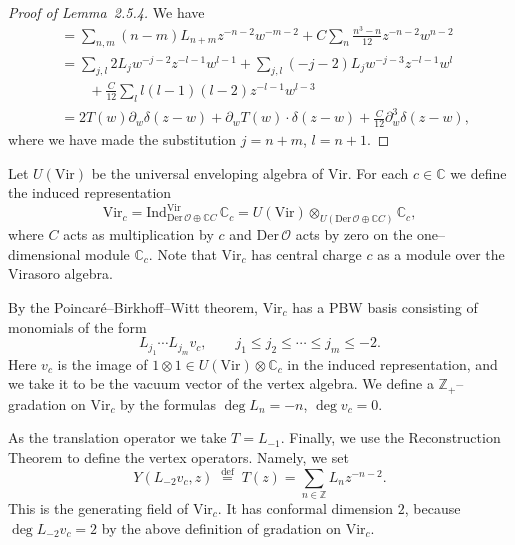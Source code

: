 \documentclass[12pt]{article}
\begin{document}
\begin{proof}[Proof of Lemma~2.5.4]
    We have
    \begin{align*}
        [T(z),T(w)]
         & = \sum_{n,m}(n-m)L_{n+m}z^{-n-2}w^{-m-2}
        + C\sum_n \frac{n^3 - n}{12}z^{-n-2}w^{n-2}     \\[4pt]
         & = \sum_{j,l} 2L_j w^{-j-2}z^{-l-1}w^{l-1}
        + \sum_{j,l}(-j-2)L_j w^{-j-3}z^{-l-1}w^l       \\[4pt]
         & \qquad
        + \frac{C}{12}\sum_l l(l-1)(l-2)z^{-l-1}w^{l-3} \\[4pt]
         & = 2T(w)\partial_w\delta(z-w)
        + \partial_w T(w)\cdot\delta(z-w)
        + \frac{C}{12}\partial_w^3\delta(z-w),
    \end{align*}
    where we have made the substitution $j=n+m$, $l=n+1$.
\end{proof}

Let $U(\mathrm{Vir})$ be the universal enveloping algebra
of $\mathrm{Vir}$. For each $c\in\mathbb{C}$ we define the induced
representation
\[
    \mathrm{Vir}_c
    = \mathrm{Ind}^{\mathrm{Vir}}_{\mathrm{Der}\,\mathcal{O}\oplus\mathbb{C}C}\,\mathbb{C}_c
    = U(\mathrm{Vir}) \otimes_{U(\mathrm{Der}\,\mathcal{O}\oplus\mathbb{C}C)} \mathbb{C}_c,
\]
where $C$ acts as multiplication by $c$ and $\mathrm{Der}\,\mathcal{O}$ acts by zero
on the one--dimensional module $\mathbb{C}_c$.
Note that $\mathrm{Vir}_c$ has central charge $c$ as a module over the Virasoro algebra.

By the Poincaré--Birkhoff--Witt theorem, $\mathrm{Vir}_c$ has a PBW basis
consisting of monomials of the form
\begin{equation}\label{2.5.3}
    L_{j_1}\cdots L_{j_m}v_c, \qquad j_1\le j_2\le\cdots\le j_m\le -2.
\end{equation}
Here $v_c$ is the image of $1\otimes1\in U(\mathrm{Vir})\otimes\mathbb{C}_c$
in the induced representation, and we take it to be the vacuum vector of
the vertex algebra.
We define a $\mathbb{Z}_+$--gradation on $\mathrm{Vir}_c$ by the formulas
$\deg L_n = -n$, $\deg v_c = 0$.

As the translation operator we take $T=L_{-1}$.
Finally, we use the Reconstruction Theorem to define the vertex operators.
Namely, we set
\[
    Y(L_{-2}v_c,z) \; \overset{\mathrm{def}}{=}\; T(z)
    = \sum_{n\in\mathbb{Z}} L_n z^{-n-2}.
\]
This is the generating field of $\mathrm{Vir}_c$.
It has conformal dimension $2$, because $\deg L_{-2}v_c=2$
by the above definition of gradation on $\mathrm{Vir}_c$.
\end{document}
